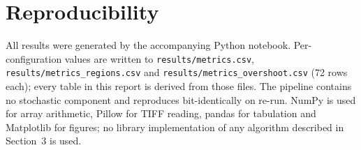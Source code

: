 \documentclass[11pt,a4paper]{article}
\begin{document}
\section*{Reproducibility}

All results were generated by the accompanying Python notebook. Per-configuration values are
written to \texttt{results/metrics.csv}, \texttt{results/metrics\_regions.csv} and
\texttt{results/metrics\_overshoot.csv} (72 rows each); every table in this report is derived
from those files. The pipeline contains no
stochastic component and reproduces bit-identically on re-run. NumPy is used for array
arithmetic, Pillow for TIFF reading, pandas for tabulation and Matplotlib for figures; no
library implementation of any algorithm described in Section~3 is used.
\end{document}
